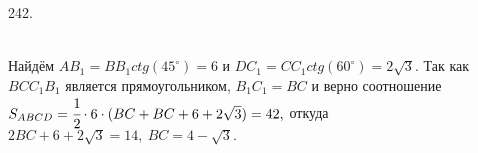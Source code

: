 242. \begin{figure}[ht!]
\end{figure}\\
Найдём $AB_1=BB_1 ctg(45^\circ)=6$ и $DC_1=CC_1 ctg(60^\circ)=2\sqrt{3}.$ Так как $BCC_1B_1$ является прямоугольником, $B_1C_1=BC$ и верно соотношение
$S_{ABCD}=\cfrac{1}{2}\cdot6\cdot(BC+BC+6+2\sqrt{3})=42,$ откуда $2BC+6+2\sqrt{3}=14,\ BC=4-\sqrt{3}.$\\
